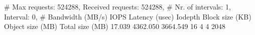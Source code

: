 # Max requests: 524288, Received requests: 524288, 
# Nr. of intervals: 1, Interval: 0, 
# Bandwidth (MB/s)	IOPS	Latency (usec)	Iodepth	Block size (KB)	Object size (MB)	Total size (MB)
  17.039		4362.050		3664.549	16		4		4		2048
